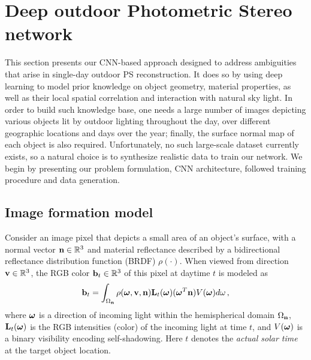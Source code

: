 \section{Deep outdoor Photometric Stereo network}
\label{sec:proposed_method}

This section presents our CNN-based approach designed to address ambiguities that arise in single-day outdoor PS reconstruction. It does so by using deep learning to model prior knowledge on object geometry, material properties, as well as their local spatial correlation and interaction with natural sky light. In order to build such knowledge base, one needs a large number of images depicting various objects lit by outdoor lighting throughout the day, over different geographic locations and days over the year; finally, the surface normal map of each object is also required. Unfortunately, no such large-scale dataset currently exists, so a natural choice is to synthesize realistic data to train our network. We begin by presenting our problem formulation, CNN architecture, followed training procedure and data generation.

\subsection{Image formation model} %



Consider an image pixel that depicts a small area of an object's surface, with a normal vector ${\bf n} \in \mathbb{R}^3$ and material reflectance described by a bidirectional reflectance distribution function (BRDF) $\rho(\cdot)$. When viewed from direction \mbox{${\bf v} \in \mathbb{R}^3$}, the RGB color ${\bf b}_t \in \mathbb{R}^3$ of this pixel at daytime $t$ is modeled as
%
\begin{equation}
{\bf b}_t = \int_{\Omega_{\bf n}} \rho(\boldsymbol \omega, {\bf v}, {\bf n}) {\bf  L}_t(\mathbf{\boldsymbol \omega}) (\boldsymbol \omega^T{\bf n}) V(\boldsymbol \omega) d\omega \,,
\label{eq:ifm_singlepixel}
\end{equation}
%
where $\boldsymbol \omega$ is a direction of incoming light within the hemispherical domain $\Omega_{\bf n}$, ${\bf L}_t(\mathbf{\boldsymbol \omega})$ is the RGB intensities (color) of the incoming light at time $t$, and $V(\boldsymbol \omega)$ is a binary visibility encoding self-shadowing. Here $t$ denotes the {\em actual solar time} at the target object location.

